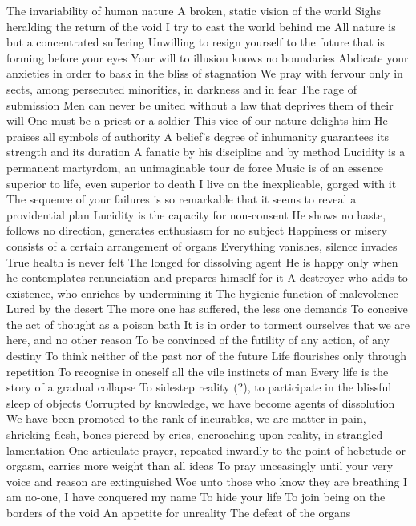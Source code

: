\documentclass{article}
\begin{document}
The invariability of human nature
A broken, static vision of the world
Sighs heralding the return of the void
I try to cast the world behind me
All nature is but a concentrated suffering
Unwilling to resign yourself to the future that is forming before your eyes
Your will to illusion knows no boundaries
Abdicate your anxieties in order to bask in the bliss of stagnation
We pray with fervour only in sects, among persecuted minorities, in darkness and in fear
The rage of submission
Men can never be united without a law that deprives them of their will
One must be a priest or a soldier
This vice of our nature delights him
He praises all symbols of authority
A belief's degree of inhumanity guarantees its strength and its duration
A fanatic by his discipline and by method
Lucidity is a permanent martyrdom, an unimaginable tour de force
Music is of an essence superior to life, even superior to death
I live on the inexplicable, gorged with it
The sequence of your failures is so remarkable that it seems to reveal a providential plan
Lucidity is the capacity for non-consent
He shows no haste, follows no direction, generates enthusiasm for no subject
Happiness or misery consists of a certain arrangement of organs
Everything vanishes, silence invades
True health is never felt
The longed for dissolving agent
He is happy only when he contemplates renunciation and prepares himself for it
A destroyer who adds to existence, who enriches by undermining it
The hygienic function of malevolence
Lured by the desert
The more one has suffered, the less one demands
To conceive the act of thought as a poison bath
It is in order to torment ourselves that we are here, and no other reason
To be convinced of the futility of any action, of any destiny
To think neither of the past nor of the future
Life flourishes only through repetition
To recognise in oneself all the vile instincts of man
Every life is the story of a gradual collapse
To sidestep reality (?), to participate in the blissful sleep of objects
Corrupted by knowledge, we have become agents of dissolution
We have been promoted to the rank of incurables, we are matter in pain, shrieking flesh, bones pierced by cries, encroaching upon reality, in strangled lamentation
One articulate prayer, repeated inwardly to the point of hebetude or orgasm, carries more weight than all ideas
To pray unceasingly until your very voice and reason are extinguished
Woe unto those who know they are breathing
I am no-one, I have conquered my name
To hide your life
To join being on the borders of the void
An appetite for unreality
The defeat of the organs
\end{document}
